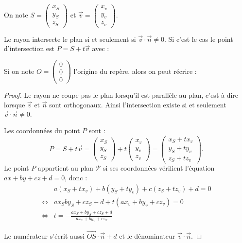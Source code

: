 \documentclass[11pt,class=report,crop=false]{standalone}
\begin{document}
On note
$S = \left(\begin{smallmatrix}x_S\\y_S\\z_S\end{smallmatrix}\right)$
et
$\vec v = \left(\begin{smallmatrix}x_v\\y_v\\z_v\end{smallmatrix}\right)$.

\begin{proposition}
Le rayon intersecte le plan si et seulement si $\vec{v} \cdot \vec{n} \neq 0$.
Si c'est le cas le point d'intersection est $P = S + t\vec{v}$ avec :
\end{proposition}



Si on note $O = \left(\begin{smallmatrix}0\\0\\0\end{smallmatrix}\right)$ l'origine du repère, alors on peut récrire :


\begin{proof}
Le rayon ne coupe pas le plan lorsqu'il est parallèle au plan, c'est-à-dire lorsque $\vec v$ et $\vec n$ sont orthogonaux. Ainsi l'intersection existe si et seulement $\vec{v} \cdot \vec{n} \neq 0$.

Les coordonnées du point $P$ sont :
$$P 
= S +t \vec v 
= \begin{pmatrix}x_S\\y_S\\z_S\end{pmatrix} + t \begin{pmatrix}x_v\\y_v\\z_v\end{pmatrix}
= \begin{pmatrix}x_S +tx_v\\y_S +t y_v\\z_S +tz_v\end{pmatrix}.
$$
Le point $P$ appartient au plan $\mathcal{P}$ si ses coordonnées vérifient l'équation $ax+by+cz+d=0$, donc :
\begin{align*}
      & a(x_S +tx_v) + b(y_S +t y_v) + c(z_S +tz_v) + d = 0 \\
\iff  & ax_S by_S+cz_S + d + t(ax_v + by_v + cz_v)= 0 \\
\iff  & t = - \frac{ax_S + by_S + cz_S + d}{ax_v + by_v + cz_v}
\end{align*}

Le numérateur s'écrit aussi $\overrightarrow{OS}\cdot\vec{n} + d$ et le dénominateur $\vec{v} \cdot \vec{n}$.

\end{proof}
\end{document}

